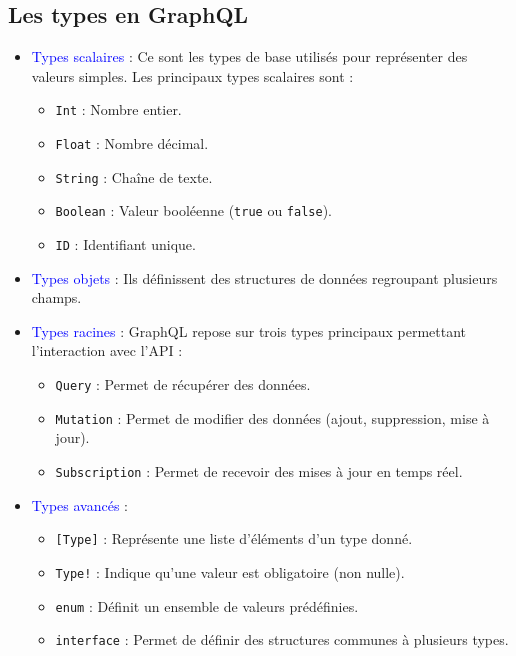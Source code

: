 \documentclass{article}
\begin{document}
\subsection{Les types en GraphQL}
\begin{itemize}
    \item \textcolor{blue}{Types scalaires} : Ce sont les types de base utilisés pour représenter des valeurs simples. Les principaux types scalaires sont :
    \begin{itemize}
        \item \texttt{Int} : Nombre entier.
        \item \texttt{Float} : Nombre décimal.
        \item \texttt{String} : Chaîne de texte.
        \item \texttt{Boolean} : Valeur booléenne (\texttt{true} ou \texttt{false}).
        \item \texttt{ID} : Identifiant unique.
    \end{itemize}

    \item \textcolor{blue}{Types objets} : Ils définissent des structures de données regroupant plusieurs champs.
    
    \item \textcolor{blue}{Types racines} : GraphQL repose sur trois types principaux permettant l'interaction avec l'API :
    \begin{itemize}
        \item \texttt{Query} : Permet de récupérer des données.
        \item \texttt{Mutation} : Permet de modifier des données (ajout, suppression, mise à jour).
        \item \texttt{Subscription} : Permet de recevoir des mises à jour en temps réel.
    \end{itemize}

    \item \textcolor{blue}{Types avancés} :
    \begin{itemize}
        \item \texttt{[Type]} : Représente une liste d'éléments d'un type donné.
        \item \texttt{Type!} : Indique qu'une valeur est obligatoire (non nulle).
        \item \texttt{enum} : Définit un ensemble de valeurs prédéfinies.
        \item \texttt{interface} : Permet de définir des structures communes à plusieurs types.
    \end{itemize}
\end{itemize}
\end{document}
